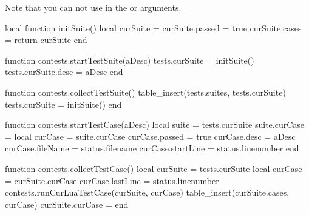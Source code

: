 
\startchapter[title=Unit Test Suites]

Note that you can not use  in the \type{\startTestSuite} or 
\type{\startTestCase} arguments. 

\startMkIVCode

\def\startTestSuite[#1]{%
  \startsubsection[title=Test Suite: #1]
  \directlua{thirddata.contests.startTestSuite("#1")}
}

\def\stopTestSuite{%
  \stopsubsection%
  \directlua{thirddata.contests.collectTestSuite()}
}

\def\startTestCase[#1]{%
  \starttextrule{Test case}
  \noindent {\tfa #1} \godown[2ex]
  \directlua{thirddata.contests.startTestCase("#1")}
}

\def\stopTestCase{%
  \directlua{thirddata.contests.collectTestCase()}
  \stoptextrule%
}

\def\reportFailures{%
  \directlua{thirddata.contests.reportFailures()}
}

\stopMkIVCode

\startLuaCode

local function initSuite()
  local curSuite = {}
  curSuite.passed = true
  curSuite.cases  = {}
  return curSuite
end

function contests.startTestSuite(aDesc)
  tests.curSuite      = initSuite()
  tests.curSuite.desc = aDesc
end

function contests.collectTestSuite()
  table_insert(tests.suites, tests.curSuite)
  tests.curSuite = initSuite()
end

function contests.startTestCase(aDesc)
  local suite       = tests.curSuite
  suite.curCase     = {}
  local curCase     = suite.curCase
  curCase.passed    = true
  curCase.desc      = aDesc
  curCase.fileName  = status.filename
  curCase.startLine = status.linenumber
end

function contests.collectTestCase()
  local curSuite   = tests.curSuite
  local curCase    = curSuite.curCase
  curCase.lastLine = status.linenumber
  contests.runCurLuaTestCase(curSuite, curCase)
  table_insert(curSuite.cases, curCase)
  curSuite.curCase = {}
end

